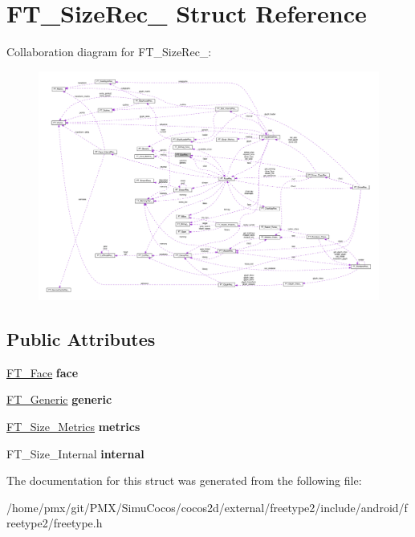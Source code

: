 \hypertarget{structFT__SizeRec__}{}\section{F\+T\+\_\+\+Size\+Rec\+\_\+ Struct Reference}
\label{structFT__SizeRec__}


Collaboration diagram for F\+T\+\_\+\+Size\+Rec\+\_\+\+:
\nopagebreak
\begin{figure}[H]
\begin{center}
\leavevmode
\includegraphics[width=350pt]{structFT__SizeRec____coll__graph}
\end{center}
\end{figure}
\subsection*{Public Attributes}
\begin{DoxyCompactItemize}
\item 
\mbox{\label{structFT__SizeRec___a21b54fb07feaba8be23321054da98f5f}} 
\hyperlink{structFT__FaceRec__}{F\+T\+\_\+\+Face} {\bfseries face}
\item 
\mbox{\label{structFT__SizeRec___aa24520b093a9b4ba9ff388bfe7b9491d}} 
\hyperlink{structFT__Generic__}{F\+T\+\_\+\+Generic} {\bfseries generic}
\item 
\mbox{\label{structFT__SizeRec___a29a6b518d09f6cf1714d9aed01eddc01}} 
\hyperlink{structFT__Size__Metrics__}{F\+T\+\_\+\+Size\+\_\+\+Metrics} {\bfseries metrics}
\item 
\mbox{\label{structFT__SizeRec___a236c47ea3138e485c29b0d7baa5cf3b6}} 
F\+T\+\_\+\+Size\+\_\+\+Internal {\bfseries internal}
\end{DoxyCompactItemize}


The documentation for this struct was generated from the following file\+:\begin{DoxyCompactItemize}
\item 
/home/pmx/git/\+P\+M\+X/\+Simu\+Cocos/cocos2d/external/freetype2/include/android/freetype2/freetype.\+h\end{DoxyCompactItemize}
